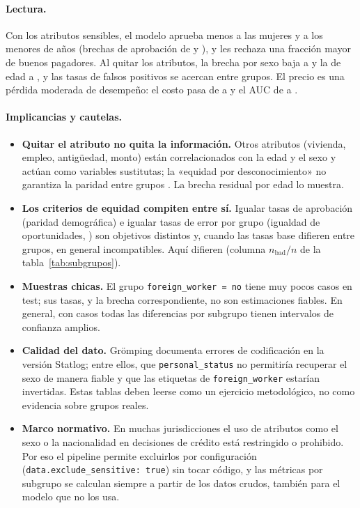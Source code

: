 \documentclass[11pt,a4paper]{article}
\newcommand{\code}[1]{\texttt{#1}}
\theoremstyle{plain}
\theoremstyle{definition}
\theoremstyle{remark}
\numberwithin{equation}{section}
\begin{document}
\paragraph{Lectura.} Con los atributos sensibles, el modelo aprueba menos a las mujeres y a
los menores de \ResAgeThreshold{} años (brechas de aprobación de \ResSensGapSex{} y
\ResSensGapAge), y les rechaza una fracción mayor de buenos pagadores. Al quitar los
atributos, la brecha por sexo baja a \ResNoSensGapSex{} y la de edad a \ResNoSensGapAge, y
las tasas de falsos positivos se acercan entre grupos. El precio es una pérdida moderada de
desempeño: el costo pasa de \ResSensCost{} a \ResNoSensCost{} y el AUC de \ResSensAuc{} a
\ResNoSensAuc.

\paragraph{Implicancias y cautelas.}
\begin{itemize}
  \item \textbf{Quitar el atributo no quita la información.} Otros atributos (vivienda,
        empleo, antigüedad, monto) están correlacionados con la edad y el sexo y actúan como
        variables sustitutas; la «equidad por desconocimiento» no garantiza la paridad entre
        grupos \cite{barocas2023}. La brecha residual por edad lo muestra.
  \item \textbf{Los criterios de equidad compiten entre sí.} Igualar tasas de aprobación
        (paridad demográfica) e igualar tasas de error por grupo (igualdad de oportunidades,
        \cite{hardt2016}) son objetivos distintos y, cuando las tasas base difieren entre
        grupos, en general incompatibles. Aquí difieren (columna $n_{\text{bad}}/n$ de la
        tabla~\ref{tab:subgrupos}).
  \item \textbf{Muestras chicas.} El grupo \code{foreign\_worker = no} tiene muy pocos casos
        en test; sus tasas, y la brecha correspondiente, no son estimaciones fiables. En
        general, con \ResNTest{} casos todas las diferencias por subgrupo tienen intervalos
        de confianza amplios.
  \item \textbf{Calidad del dato.} Grömping \cite{gromping2019} documenta errores de
        codificación en la versión Statlog; entre ellos, que \code{personal\_status} no
        permitiría recuperar el sexo de manera fiable y que las etiquetas de
        \code{foreign\_worker} estarían invertidas. Estas tablas deben leerse como un
        ejercicio metodológico, no como evidencia sobre grupos reales.
  \item \textbf{Marco normativo.} En muchas jurisdicciones el uso de atributos como el sexo
        o la nacionalidad en decisiones de crédito está restringido o prohibido. Por eso el
        pipeline permite excluirlos por configuración (\code{data.exclude\_sensitive: true})
        sin tocar código, y las métricas por subgrupo se calculan siempre a partir de los
        datos crudos, también para el modelo que no los usa.
\end{itemize}
\end{document}
